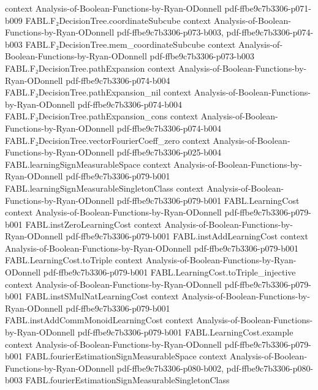 \begin{theorem}
  {context}
  {Analysis-of-Boolean-Functions-by-Ryan-ODonnell}
  {pdf-ffbe9c7b3306-p071-b009}
\proofstep
  {FABL.F₂DecisionTree.coordinateSubcube}
  {context}
  {Analysis-of-Boolean-Functions-by-Ryan-ODonnell}
  {pdf-ffbe9c7b3306-p073-b003,
    pdf-ffbe9c7b3306-p074-b003}
\proofstep
  {FABL.F₂DecisionTree.mem_coordinateSubcube}
  {context}
  {Analysis-of-Boolean-Functions-by-Ryan-ODonnell}
  {pdf-ffbe9c7b3306-p073-b003}
\proofstep
  {FABL.F₂DecisionTree.pathExpansion}
  {context}
  {Analysis-of-Boolean-Functions-by-Ryan-ODonnell}
  {pdf-ffbe9c7b3306-p074-b004}
\proofstep
  {FABL.F₂DecisionTree.pathExpansion_nil}
  {context}
  {Analysis-of-Boolean-Functions-by-Ryan-ODonnell}
  {pdf-ffbe9c7b3306-p074-b004}
\proofstep
  {FABL.F₂DecisionTree.pathExpansion_cons}
  {context}
  {Analysis-of-Boolean-Functions-by-Ryan-ODonnell}
  {pdf-ffbe9c7b3306-p074-b004}
\proofstep
  {FABL.F₂DecisionTree.vectorFourierCoeff_zero}
  {context}
  {Analysis-of-Boolean-Functions-by-Ryan-ODonnell}
  {pdf-ffbe9c7b3306-p025-b004}
\proofstep
  {FABL.learningSignMeasurableSpace}
  {context}
  {Analysis-of-Boolean-Functions-by-Ryan-ODonnell}
  {pdf-ffbe9c7b3306-p079-b001}
\proofstep
  {FABL.learningSignMeasurableSingletonClass}
  {context}
  {Analysis-of-Boolean-Functions-by-Ryan-ODonnell}
  {pdf-ffbe9c7b3306-p079-b001}
\proofstep
  {FABL.LearningCost}
  {context}
  {Analysis-of-Boolean-Functions-by-Ryan-ODonnell}
  {pdf-ffbe9c7b3306-p079-b001}
\proofstep
  {FABL.instZeroLearningCost}
  {context}
  {Analysis-of-Boolean-Functions-by-Ryan-ODonnell}
  {pdf-ffbe9c7b3306-p079-b001}
\proofstep
  {FABL.instAddLearningCost}
  {context}
  {Analysis-of-Boolean-Functions-by-Ryan-ODonnell}
  {pdf-ffbe9c7b3306-p079-b001}
\proofstep
  {FABL.LearningCost.toTriple}
  {context}
  {Analysis-of-Boolean-Functions-by-Ryan-ODonnell}
  {pdf-ffbe9c7b3306-p079-b001}
\proofstep
  {FABL.LearningCost.toTriple_injective}
  {context}
  {Analysis-of-Boolean-Functions-by-Ryan-ODonnell}
  {pdf-ffbe9c7b3306-p079-b001}
\proofstep
  {FABL.instSMulNatLearningCost}
  {context}
  {Analysis-of-Boolean-Functions-by-Ryan-ODonnell}
  {pdf-ffbe9c7b3306-p079-b001}
\proofstep
  {FABL.instAddCommMonoidLearningCost}
  {context}
  {Analysis-of-Boolean-Functions-by-Ryan-ODonnell}
  {pdf-ffbe9c7b3306-p079-b001}
\proofstep
  {FABL.LearningCost.example}
  {context}
  {Analysis-of-Boolean-Functions-by-Ryan-ODonnell}
  {pdf-ffbe9c7b3306-p079-b001}
\proofstep
  {FABL.fourierEstimationSignMeasurableSpace}
  {context}
  {Analysis-of-Boolean-Functions-by-Ryan-ODonnell}
  {pdf-ffbe9c7b3306-p080-b002,
    pdf-ffbe9c7b3306-p080-b003}
\proofstep
  {FABL.fourierEstimationSignMeasurableSingletonClass}

\end{theorem}
